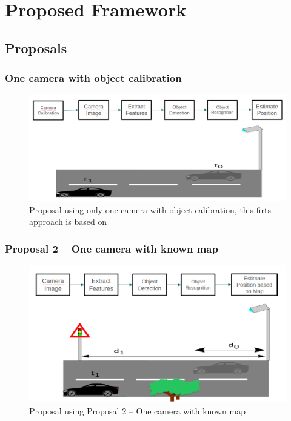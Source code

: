 
\chapter{Proposed Framework}
\label{capitulo4}


\section{Proposals}

\subsection{One camera with object calibration}
\begin{figure}[H]
\centering
\includegraphics[width=\textwidth]{imagens/proposal1.png}
\caption{Proposal using only one camera with object calibration, this firts approach is based on \cite{8678911}}
\label{fig:proposal1}
\end{figure}


\subsection{Proposal 2 – One camera with known map}
\begin{figure}[H]
\centering
\includegraphics[width=\textwidth]{imagens/proposal2.png}
\caption{Proposal using Proposal 2 – One camera with known map}
\label{fig:proposal2}
\end{figure}


